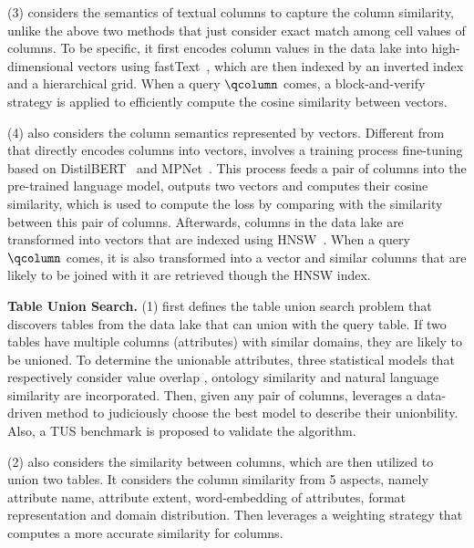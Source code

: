 
 

 \noindent  (3) \pex considers the semantics of textual columns to capture the column similarity, unlike the above two methods that just consider exact match among cell values of columns. To be specific, it first encodes column values in the data lake into high-dimensional vectors using fastText~\cite{}, which are then indexed by an inverted index and a hierarchical grid. When a query $\qcolumn$ comes, a block-and-verify strategy is applied to efficiently compute the cosine similarity between vectors.
 
 
 
 \noindent  (4) \deepjoin also considers the column semantics represented by vectors. Different from \pex that directly encodes columns into vectors,  \deepjoin involves a training process fine-tuning based on DistilBERT~\cite{} and MPNet~\cite{}. This process feeds a pair of columns into the pre-trained language model,  outputs two vectors and computes their cosine similarity, which is used to compute the loss by comparing with the similarity between this pair of columns. Afterwards,  columns in the data lake are transformed into vectors that are indexed using HNSW~\cite{}. When a query $\qcolumn$ comes, it is also transformed into a vector and similar columns that are likely to be joined with it are retrieved though the HNSW index.
 
 
 



\noindent\textbf{Table Union Search.}
 (1) \tus first defines the table union search problem that discovers tables from the data lake that can union with the query table. If two tables have multiple columns (\ie attributes) with similar domains, they are likely to be unioned. To determine the unionable attributes, three statistical models that respectively consider value overlap , ontology similarity and natural language similarity are incorporated. Then, given any pair of columns,  \tus leverages a data-driven  method to judiciously choose the best model to describe their unionbility. Also, a TUS benchmark is proposed to validate the algorithm.  

 \noindent  (2) \dlll also considers the similarity between columns, which are then utilized to union two tables. It considers the column similarity from 5 aspects, namely attribute name, attribute extent, word-embedding of attributes, format representation and domain distribution. Then \dlll leverages a weighting strategy that computes a more accurate similarity for columns.
 
